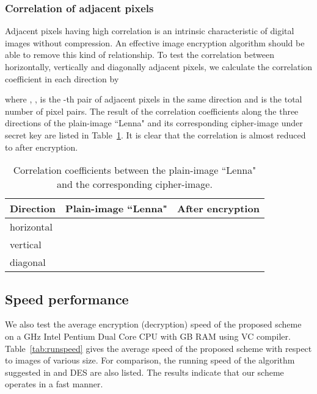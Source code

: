 \documentclass[3p,preprint,11pt]{elsarticle}
\begin{document}
\subsubsection{Correlation of adjacent pixels}
Adjacent pixels having high correlation
is an intrinsic characteristic of digital images without compression.
An effective image encryption algorithm should be able to remove this kind of relationship. To test the correlation
between horizontally, vertically and diagonally adjacent pixels,
we calculate the correlation coefficient in each direction by

where , ,  is
the -th pair of adjacent pixels in the same direction and  is the total number of pixel pairs.
The result of the correlation coefficients along the three directions of the plain-image ``Lenna" and its corresponding
cipher-image under secret key  are listed in Table~\ref{tab:correaltionship}.
It is clear that the correlation is almost reduced to  after encryption.
\begin{table}[!htb]
\centering \caption{Correlation coefficients between the plain-image ``Lenna" and the corresponding cipher-image.}
 \begin{tabular}{ p{4.2cm}  p{4.2cm}  p{4.2cm}}
\hline   Direction    & Plain-image ``Lenna"    & After encryption     \\
\hline      horizontal  &      &      \\
\hline      vertical    &      &     \\
\hline      diagonal    &      &      \\
\hline
\end{tabular}
\label{tab:correaltionship}
\end{table}

\subsection{Speed performance}
We also test the average encryption (decryption) speed of the proposed scheme on a GHz Intel
Pentium Dual Core CPU with GB RAM using VC compiler.
Table~\ref{tab:runspeed} gives the average speed of the
proposed scheme with respect to images of various size.
For comparison, the running speed of the algorithm suggested in \cite{Chen:3DChaoticCipher:CSF04} and DES
are also listed. The results indicate that our scheme operates in a fast manner.
\end{document}
